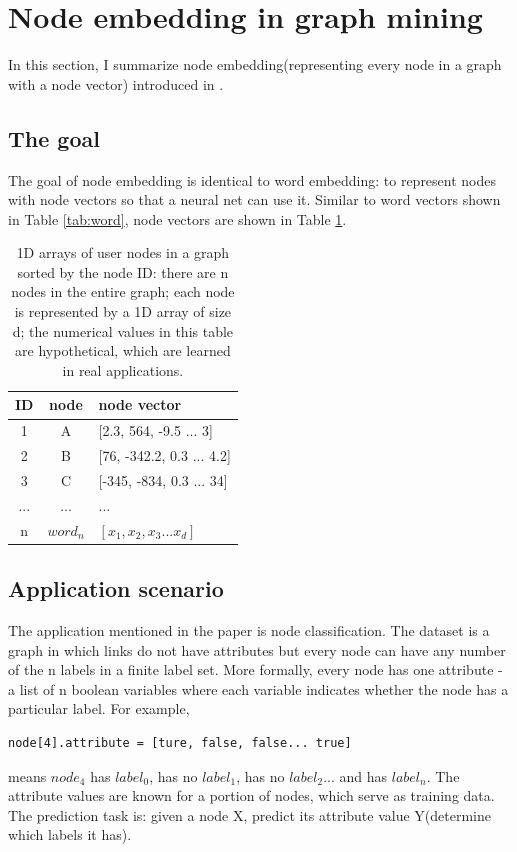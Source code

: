 \documentclass{article}
\begin{document}
\section{Node embedding in graph mining}

In this section, I summarize node embedding(representing every node in a graph with a node vector) introduced in \cite{perozzi2014deepwalk}.

\subsection{The goal}

The goal of node embedding is identical to word embedding: to represent nodes with node vectors so that a neural net can use it. Similar to word vectors shown in Table \ref{tab:word}, node vectors are shown in Table \ref{tab:node}.

\begin{table}[h]
	\centering
	\begin{tabularx}{0.5\textwidth}{|c|c|X|} \hline
		ID & node & node vector \\ \hline
		1 & A & [2.3, 564, -9.5 ... 3] \\ \hline
		2 & B & [76, -342.2, 0.3 ... 4.2] \\ \hline
		3 & C & [-345, -834, 0.3 ... 34] \\ \hline
		... & ... & ... \\ \hline
		n & $ word_n $ & $ [x_1, x_2, x_3 ... x_d] $ \\ \hline
	\end{tabularx}
	\caption{1D arrays of user nodes in a graph sorted by the node ID: there are n nodes in the entire graph; each node is represented by a 1D array of size d; the numerical values in this table are hypothetical, which are learned in real applications.}
	\label{tab:node}
\end{table}

\subsection{Application scenario}

The application mentioned in the paper is node classification. The dataset is a graph in which links do not have attributes but every node can have any number of the n labels in a finite label set. More formally, every node has one attribute - a list of n boolean variables where each variable indicates whether the node has a particular label. For example,
\begin{lstlisting}
node[4].attribute = [ture, false, false... true]
\end{lstlisting}
means $ node_4 $ has $ label_0 $, has no $ label_1 $, has no $ label_2 $... and has $ label_n $. The attribute values are known for a portion of nodes, which serve as training data. The prediction task is: given a node X, predict its attribute value Y(determine which labels it has).
\end{document}
